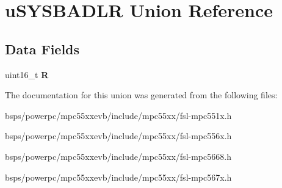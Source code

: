 \hypertarget{unionuSYSBADLR}{}\section{u\+S\+Y\+S\+B\+A\+D\+LR Union Reference}
\label{unionuSYSBADLR}
\subsection*{Data Fields}
\begin{DoxyCompactItemize}
\item 
\mbox{\label{unionuSYSBADLR_a106224ec26d89e25d09282a89046911c}} 
uint16\+\_\+t {\bfseries R}
\end{DoxyCompactItemize}


The documentation for this union was generated from the following files\+:\begin{DoxyCompactItemize}
\item 
bsps/powerpc/mpc55xxevb/include/mpc55xx/fsl-\/mpc551x.\+h\item 
bsps/powerpc/mpc55xxevb/include/mpc55xx/fsl-\/mpc556x.\+h\item 
bsps/powerpc/mpc55xxevb/include/mpc55xx/fsl-\/mpc5668.\+h\item 
bsps/powerpc/mpc55xxevb/include/mpc55xx/fsl-\/mpc567x.\+h\end{DoxyCompactItemize}
